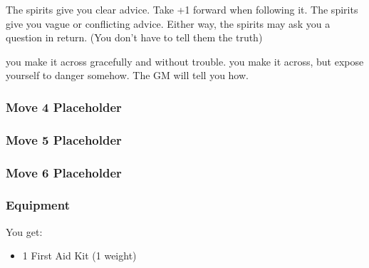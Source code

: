 
{The spirits give you clear advice. Take +1 forward when following it.}
{The spirits give you vague or conflicting advice.}
Either way, the spirits may ask you a question in return. (You don't have to tell them the truth)

{you make it across gracefully and without trouble.}
{you make it across, but expose yourself to danger somehow. The GM will tell you how.}

\subsubsection{Move 4 Placeholder} %

\subsubsection{Move 5 Placeholder} %

\subsubsection{Move 6 Placeholder} %

\subsubsection{Equipment}

You get:
\begin{itemize}
\item 1 First Aid Kit (1 weight)
\end{itemize}


